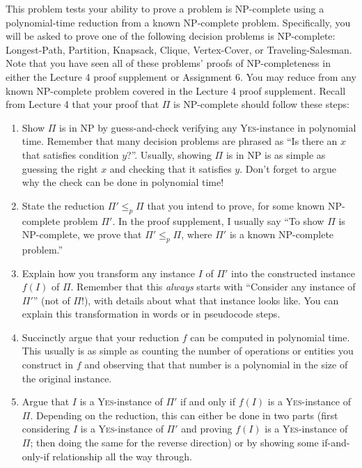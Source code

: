 \documentclass[10pt]{article}
\begin{document}
This problem tests your ability to prove a problem is NP-complete using a polynomial-time reduction from a known NP-complete problem.
Specifically, you will be asked to prove one of the following decision problems is NP-complete: \textsf{Longest-Path}, \textsf{Partition}, \textsf{Knapsack}, \textsf{Clique}, \textsf{Vertex-Cover}, or \textsf{Traveling-Salesman}.
Note that you have seen all of these problems' proofs of NP-completeness in either the Lecture 4 proof supplement or Assignment 6.
You may reduce from any known NP-complete problem covered in the Lecture 4 proof supplement.
Recall from Lecture 4 that your proof that $\Pi$ is NP-complete should follow these steps:
\begin{enumerate}
\item Show $\Pi$ is in NP by guess-and-check verifying any \textsc{Yes}-instance in polynomial time.
Remember that many decision problems are phrased as ``Is there an $x$ that satisfies condition $y$?''.
Usually, showing $\Pi$ is in NP is as simple as guessing the right $x$ and checking that it satisfies $y$.
Don't forget to argue why the check can be done in polynomial time!

\item State the reduction $\Pi' \leq_p \Pi$ that you intend to prove, for some known NP-complete problem $\Pi'$.
In the proof supplement, I usually say ``To show $\Pi$ is NP-complete, we prove that $\Pi' \leq_p \Pi$, where $\Pi'$ is a known NP-complete problem.''

\item Explain how you transform any instance $I$ of $\Pi'$ into the constructed instance $f(I)$ of $\Pi$.
Remember that this \textit{always} starts with ``Consider any instance of $\Pi'$'' (not of $\Pi$!), with details about what that instance looks like.
You can explain this transformation in words or in pseudocode steps.

\item Succinctly argue that your reduction $f$ can be computed in polynomial time.
This usually is as simple as counting the number of operations or entities you construct in $f$ and observing that that number is a polynomial in the size of the original instance.

\item Argue that $I$ is a \textsc{Yes}-instance of $\Pi'$ if and only if $f(I)$ is a \textsc{Yes}-instance of $\Pi$.
Depending on the reduction, this can either be done in two parts (first considering $I$ is a \textsc{Yes}-instance of $\Pi'$ and proving $f(I)$ is a \textsc{Yes}-instance of $\Pi$; then doing the same for the reverse direction) or by showing some if-and-only-if relationship all the way through.
\end{enumerate}
\end{document}
